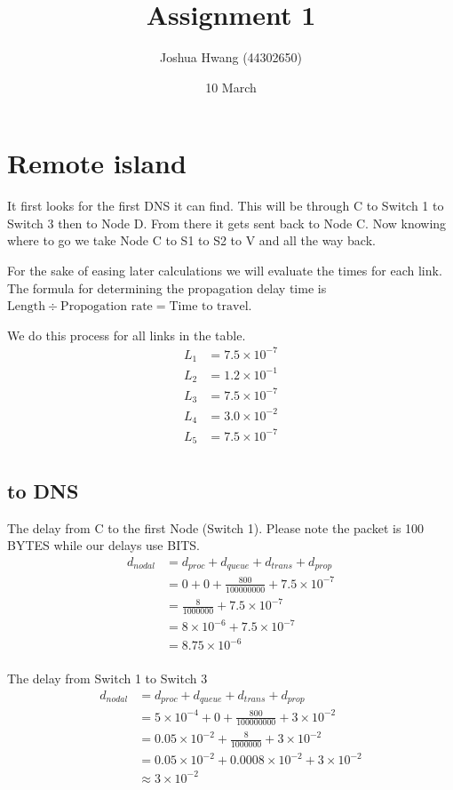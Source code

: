 \documentclass{article}
\title{Assignment 1}
\author{Joshua Hwang (44302650)}
\date{10 March}
\begin{document}
\maketitle

\section{Remote island}
It first looks for the first DNS it can find. This will be through C to Switch
1 to Switch 3 then to Node D. From there it gets sent back to Node C.
Now knowing where to go we take Node C to S1 to S2 to V and all the way back.

For the sake of easing later calculations we will evaluate the times for each
link. The formula for determining the propagation delay time is
$\text{Length} \div \text{Propogation rate} = \text{Time to travel}$.

We do this process for all links in the table.
\begin{align*}
    L_1 &= 7.5 \times 10^{-7} \\
    L_2 &= 1.2 \times 10^{-1} \\
    L_3 &= 7.5 \times 10^{-7} \\
    L_4 &= 3.0 \times 10^{-2} \\
    L_5 &= 7.5 \times 10^{-7} \\
\end{align*}

\subsection{to DNS}
The delay from C to the first Node (Switch 1). Please note the packet is
100 BYTES while our delays use BITS.
\begin{align*}
    d_{nodal} &= d_{proc} + d_{queue} + d_{trans} + d_{prop} \\
    &= 0 + 0 + \frac{800}{100000000} + 7.5 \times 10^{-7} \\
    &= \frac{8}{1000000} + 7.5 \times 10^{-7} \\
    &= 8 \times 10^{-6} + 7.5 \times 10^{-7} \\
    &= 8.75 \times 10^{-6} \\
\end{align*}

The delay from Switch 1 to Switch 3
\begin{align*}
    d_{nodal} &= d_{proc} + d_{queue} + d_{trans} + d_{prop} \\
    &= 5 \times 10^{-4} + 0 + \frac{800}{100000000} + 3 \times 10^{-2} \\
    &= 0.05 \times 10^{-2} + \frac{8}{1000000} + 3 \times 10^{-2} \\
    &= 0.05 \times 10^{-2} + 0.0008 \times 10^{-2} + 3 \times 10^{-2} \\
    &\approx 3 \times 10^{-2} \\
\end{align*}
\end{document}
